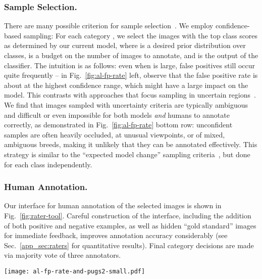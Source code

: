 \documentclass[runningheads]{llncs}
\begin{document}
\subsubsection{Sample Selection.}
There are many possible criterion for sample selection~\cite{al-survey}.
We employ confidence-based sampling: For each category , we select the  images with the top class scores  as determined by our current model, where  is a desired prior distribution over classes,  is a budget on the number of images to annotate, and  is the output of the classifier.
The intuition is as follows: even when  is large, false positives still occur quite frequently -- in Fig.~\ref{fig:al-fp-rate} left, observe that the false positive rate is about  at the highest confidence range, which might have a large impact on the model.
This contrasts with approaches that focus sampling in uncertain regions~\cite{lewis1994heterogeneous,balcan2007margin,mozafari2014scaling,erkan2010semi}.
We find that images sampled with uncertainty criteria are typically ambiguous and difficult or even impossible for both models \emph{and} humans to annotate correctly, as demonstrated in Fig.~\ref{fig:al-fp-rate} bottom row: unconfident samples are often heavily occluded, at unusual viewpoints, or of mixed, ambiguous breeds, making it unlikely that they can be annotated effectively.
This strategy is similar to the ``expected model change'' sampling criteria~\cite{settles2008multiple}, but done for each class independently.


\subsubsection{Human Annotation.}
\label{sec:raters}
Our interface for human annotation of the selected images is shown in Fig.~\ref{fig:rater-tool}.
Careful construction of the interface, including the addition of both positive and negative examples, as well as hidden ``gold standard'' images for immediate feedback, improves annotation accuracy considerably (see Sec.~\ref{app_sec:raters} for quantitative results).
Final category decisions are made via majority vote of three annotators.

\begin{figure*}[t]
\centering
\texttt{[image: al-fp-rate-and-pugs2-small.pdf]}
\caption{
  \textbf{Left:} Classifier confidence versus false positive rate on 100,000 randomly sampled from Flickr images (YFCC100M~\cite{thomee2015yfcc100m}) with dog detections.
  Even the most confident images have a 20\% false positive rate.
\textbf{Right:} Samples from Flickr.  Rectangles below images denote correct ({\color[rgb]{0,0.8,0} green}), incorrect ({\color{red} red}), or ambiguous ({\color[rgb]{0.8,0.8,0.0}yellow}).
\textbf{Top row:} Samples with high confidence for class ``Pug'' from YFCC100M.
\textbf{Bottom row:} Samples with low confidence score for class ``Pug''. 
}
\label{fig:al-fp-rate}
\end{figure*}
\end{document}
